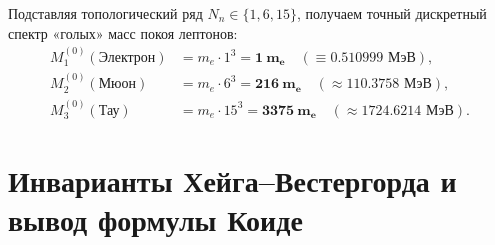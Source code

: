 \documentclass[12pt,a4paper]{article}
\begin{document}
	Подставляя топологический ряд $N_n \in \{1, 6, 15\}$, получаем точный дискретный спектр «голых» масс покоя лептонов:
	\begin{align}
		M_1^{(0)} (\text{Электрон}) &= m_e \cdot 1^3  = \mathbf{1 \ m_e} \quad (\equiv 0.510999 \text{ МэВ}), \\
		M_2^{(0)} (\text{Мюон})     &= m_e \cdot 6^3  = \mathbf{216 \ m_e} \quad (\approx 110.3758 \text{ МэВ}), \\
		M_3^{(0)} (\text{Тау})      &= m_e \cdot 15^3 = \mathbf{3375 \ m_e} \quad (\approx 1724.6214 \text{ МэВ}).
	\end{align}
	
	\section{Инварианты Хейга--Вестергорда и вывод формулы Коиде}
	
\end{document}
